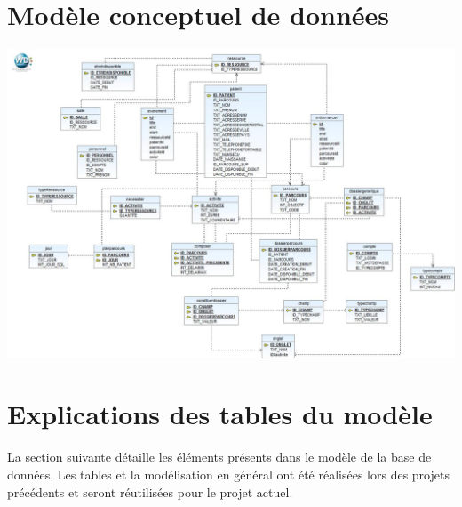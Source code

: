 \documentclass[noposter]{polytech/polytech}
\begin{document}
\chapter{Modèle conceptuel de données}
\label{ann:modeleBDD}

\begin{landscape}
	\includegraphics[scale=0.5]{images/tablesBD}
\end{landscape}

\chapter{Explications des tables du modèle}
\label{ann:expModele}


La section suivante détaille les éléments présents dans le modèle de la base de données. Les tables et la modélisation en général ont été réalisées lors des projets précédents et seront réutilisées pour le projet actuel. 
\end{document}
